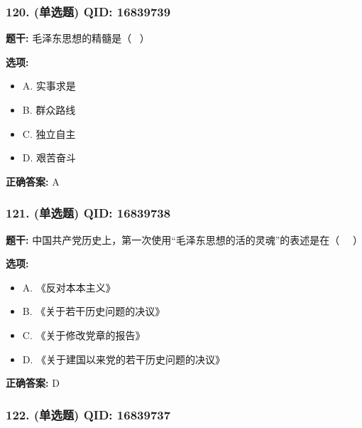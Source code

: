\documentclass[12pt,UTF8]{ctexart}
\begin{document}
\subsubsection*{120. (单选题) \small QID: 16839739}

\textbf{题干:}
毛泽东思想的精髓是（  ）

\textbf{选项:}
\begin{itemize}[leftmargin=*]

  \item A. 实事求是

  \item B. 群众路线

  \item C. 独立自主

  \item D. 艰苦奋斗

\end{itemize}

\textbf{正确答案:}
A

\vspace{0.3em}\hrulefill\vspace{0.7em}

\subsubsection*{121. (单选题) \small QID: 16839738}

\textbf{题干:}
中国共产党历史上，第一次使用“毛泽东思想的活的灵魂”的表述是在（   ）

\textbf{选项:}
\begin{itemize}[leftmargin=*]

  \item A. 《反对本本主义》

  \item B. 《关于若干历史问题的决议》

  \item C. 《关于修改党章的报告》

  \item D. 《关于建国以来党的若干历史问题的决议》

\end{itemize}

\textbf{正确答案:}
D

\vspace{0.3em}\hrulefill\vspace{0.7em}

\subsubsection*{122. (单选题) \small QID: 16839737}
\end{document}
